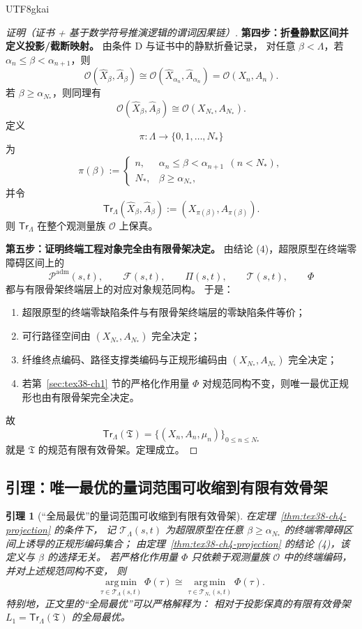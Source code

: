 \documentclass[12pt]{article}
\newtheorem{lemma}{引理}[section]
\begin{document}
\begin{CJK*}{UTF8}{gkai}
\begin{proof}[证明（证书 + 基于数学符号推演逻辑的谓词因果链）]
\textbf{第四步：折叠静默区间并定义投影/截断映射。}
由条件 D 与证书中的静默折叠记录，
对任意 $\beta<\Lambda$，若 $\alpha_n\le\beta<\alpha_{n+1}$，则
\[
  \mathcal O(\widehat X_\beta,\widehat A_\beta)
  \cong
  \mathcal O(\widehat X_{\alpha_n},\widehat A_{\alpha_n})
  =
  \mathcal O(X_n,A_n).
\]
若 $\beta\ge\alpha_{N_\ast}$，则同理有
\[
  \mathcal O(\widehat X_\beta,\widehat A_\beta)
  \cong
  \mathcal O(X_{N_\ast},A_{N_\ast}).
\]
定义
\[
  \pi:\Lambda\to\{0,1,\dots,N_\ast\}
\]
为
\[
  \pi(\beta)
  :=
  \begin{cases}
    n, & \alpha_n\le\beta<\alpha_{n+1}\ \ (n<N_\ast),\\
    N_\ast, & \beta\ge\alpha_{N_\ast},
  \end{cases}
\]
并令
\[
  \mathsf{Tr}_\Lambda(\widehat X_\beta,\widehat A_\beta)
  :=
  (X_{\pi(\beta)},A_{\pi(\beta)}).
\]
则 $\mathsf{Tr}_\Lambda$ 在整个观测量族 $\mathcal O$ 上保真。

\textbf{第五步：证明终端工程对象完全由有限骨架决定。}
由结论 (4)，超限原型在终端零障碍区间上的
\[
  \mathcal P^{\mathrm{adm}}(s,t),
  \qquad
  \mathcal F(s,t),
  \qquad
  \Pi(s,t),
  \qquad
  \mathcal T(s,t),
  \qquad
  \Phi
\]
都与有限骨架终端层上的对应对象规范同构。
于是：
\begin{enumerate}
  \item 超限原型的终端零缺陷条件与有限骨架终端层的零缺陷条件等价；
  \item 可行路径空间由 $(X_{N_\ast},A_{N_\ast})$ 完全决定；
  \item 纤维终点编码、路径支撑类编码与正规形编码由 $(X_{N_\ast},A_{N_\ast})$ 完全决定；
  \item 若第~\ref{sec:tex38-ch1} 节的严格化作用量 $\Phi$ 对规范同构不变，则唯一最优正规形也由有限骨架完全决定。
\end{enumerate}
故
\[
  \mathsf{Tr}_\Lambda(\mathfrak T)
  =
  \bigl\{
    (X_n,A_n,\mu_n)
  \bigr\}_{0\le n\le N_\ast}
\]
就是 $\mathfrak T$ 的规范有限有效骨架。定理成立。
\end{proof}

\subsection{引理：唯一最优的量词范围可收缩到有限有效骨架}
\label{subsec:tex38-ch4-lemma}

\begin{lemma}[“全局最优”的量词范围可收缩到有限有效骨架]
\label{lem:tex38-ch4-global}
在定理~\ref{thm:tex38-ch4-projection} 的条件下，
记 $\mathcal T_{\Lambda}(s,t)$ 为超限原型在任意 $\beta\ge\alpha_{N_\ast}$ 的终端零障碍区间上诱导的正规形编码集合；
由定理~\ref{thm:tex38-ch4-projection} 的结论 (4)，该定义与 $\beta$ 的选择无关。
若严格化作用量 $\Phi$ 只依赖于观测量族 $\mathcal O$ 中的终端编码，并对上述规范同构不变，
则
\[
  \operatorname*{arg\,min}_{\tau\in\mathcal T_{\Lambda}(s,t)}\Phi(\tau)
  \cong
  \operatorname*{arg\,min}_{\tau\in\mathcal T_{N_\ast}(s,t)}\Phi(\tau).
\]
特别地，正文里的“全局最优”可以严格解释为：
相对于投影保真的有限有效骨架 $L_1=\mathsf{Tr}_\Lambda(\mathfrak T)$ 的全局最优。
\end{lemma}


\end{CJK*}
\end{document}
